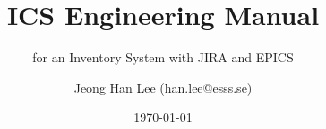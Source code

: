 \documentclass[11pt
  , a4paper
  , article
  , oneside
  , showtrims
]{memoir}
\begin{document}


\date{\today}




\title{ICS Engineering Manual}
\subtitle{for an Inventory System with JIRA and EPICS}
\author{Jeong Han Lee (han.lee@esss.se)}



\showtrimson

\esstitle
\newpage
\tableofcontents
\newpage



\end{document}

